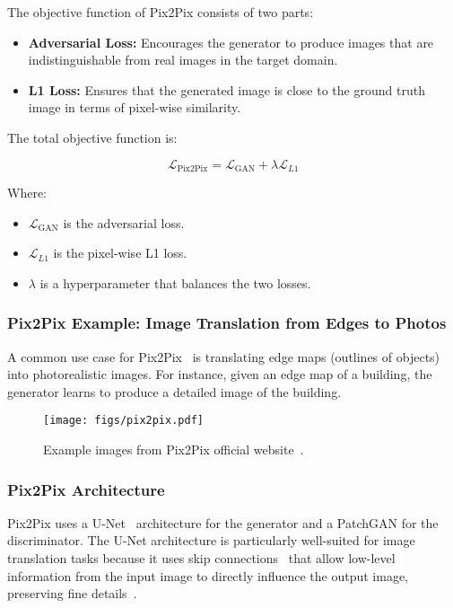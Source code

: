 The objective function of Pix2Pix consists of two parts:
\begin{itemize}
    \item \textbf{Adversarial Loss:} Encourages the generator to produce images that are indistinguishable from real images in the target domain.
    \item \textbf{L1 Loss:} Ensures that the generated image is close to the ground truth image in terms of pixel-wise similarity.
\end{itemize}

The total objective function is:

\[
\mathcal{L}_{\text{Pix2Pix}} = \mathcal{L}_{\text{GAN}} + \lambda \mathcal{L}_{L1}
\]

Where:
\begin{itemize}
    \item \( \mathcal{L}_{\text{GAN}} \) is the adversarial loss.
    \item \( \mathcal{L}_{L1} \) is the pixel-wise L1 loss.
    \item \( \lambda \) is a hyperparameter that balances the two losses.
\end{itemize}

\subsubsection{Pix2Pix Example: Image Translation from Edges to Photos}
A common use case for Pix2Pix~\cite{isola2017image} is translating edge maps (outlines of objects) into photorealistic images. For instance, given an edge map of a building, the generator learns to produce a detailed image of the building.

\begin{figure}[htbp]
    \centering
    \texttt{[image: figs/pix2pix.pdf]}
    \caption{Example images from Pix2Pix official website~\cite{isola2017image}.}
\end{figure}


\subsubsection{Pix2Pix Architecture}
Pix2Pix uses a U-Net~\cite{ronneberger2015u} architecture for the generator and a PatchGAN for the discriminator. The U-Net architecture is particularly well-suited for image translation tasks because it uses skip connections~\cite{peng2023u} that allow low-level information from the input image to directly influence the output image, preserving fine details~\cite{isola2017image}.

